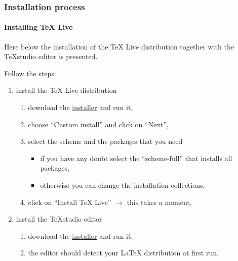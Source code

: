 \documentclass[11pt]{beamer}
\begin{document}
\begin{frame}
	\frametitle{Installation process}
	\framesubtitle{Installing \TeX{} Live}
	
	Here below the installation of the \TeX{} Live distribution together with the \TeX{}studio editor is presented.
	
	Follow the steps:
	\begin{enumerate}
		\item install the \TeX{} Live distribution
			\begin{enumerate}
				\item download the \href{https://www.tug.org/texlive/acquire-netinstall.html}{installer} and run it,
				\item choose \enquote{Custom install} and click on \enquote{Next},
				\item select the scheme and the packages that you need
				\begin{itemize}
					\item if you have any doubt select the \enquote{scheme-full} that installs all packages,
					\item otherwise you can change the installation collections,
				\end{itemize}
				\item click on \enquote{Install TeX Live} $\rightarrow$ this takes a moment,
			\end{enumerate}
		\item install the \TeX{}studio editor
			\begin{enumerate}
				\item download the \href{https://www.texstudio.org/}{installer} and run it,
				\item the editor should detect your \LaTeX{} distribution at first run.
			\end{enumerate}	
	\end{enumerate}
\end{frame}
\end{document}
